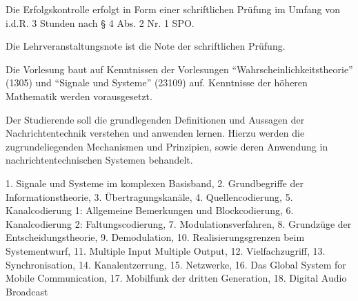 \begin{course}

\setdoclanguagegerman
{}



\coursehead


\label{cour_8097.dp_997}


\begin{styleenv}
\begin{assessment}
Die Erfolgskontrolle erfolgt in Form einer schriftlichen Prüfung im Umfang von i.d.R. 3 Stunden nach § 4 Abs. 2 Nr. 1 SPO.

 

Die Lehrveranstaltungsnote ist die Note der schriftlichen Prüfung.


\end{assessment}

\begin{conditions}Die Vorlesung baut auf Kenntnissen der Vorlesungen “Wahrscheinlichkeitstheorie” (1305) und “Signale und Systeme” (23109) auf. Kenntnisse der höheren Mathematik werden vorausgesetzt.

\end{conditions}


\end{styleenv}

\begin{learningoutcomes}
Der Studierende soll die grundlegenden Definitionen und Aussagen der Nachrichtentechnik verstehen und anwenden lernen. Hierzu werden die zugrundeliegenden Mechanismen und Prinzipien, sowie deren Anwendung in nachrichtentechnischen Systemen behandelt.


\end{learningoutcomes}

\begin{content}
1. Signale und Systeme im komplexen Basisband, 2. Grundbegriffe der Informationstheorie, 3. Übertragungskanäle, 4. Quellencodierung, 5. Kanalcodierung 1: Allgemeine Bemerkungen und Blockcodierung, 6. Kanalcodierung 2: Faltungscodierung, 7. Modulationsverfahren, 8. Grundzüge der Entscheidungstheorie, 9. Demodulation, 10. Realisierungsgrenzen beim Systementwurf, 11. Multiple Input Multiple Output, 12. Vielfachzugriff, 13. Synchronisation, 14. Kanalentzerrung, 15. Netzwerke, 16. Das Global System for Mobile Communication, 17. Mobilfunk der dritten Generation, 18. Digital Audio Broadcast



\end{content}
\end{course}
